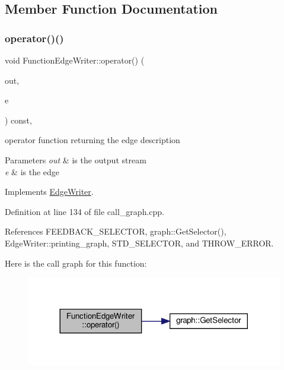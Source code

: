 \subsection{Member Function Documentation}
\mbox{\label{classFunctionEdgeWriter_afadc175ca3b7ff6076556dc850cacfa2}} 
\subsubsection{\texorpdfstring{operator()()}{operator()()}}
{\footnotesize\ttfamily void Function\+Edge\+Writer\+::operator() (\begin{DoxyParamCaption}\item[{std\+::ostream \&}]{out,  }\item[{const \hyperlink{graph_8hpp_a9eb9afea34e09f484b21f2efd263dd48}{Edge\+Descriptor} \&}]{e }\end{DoxyParamCaption}) const\hspace{0.3cm}{\ttfamily [override]}, {\ttfamily [virtual]}}



operator function returning the edge description 


\begin{DoxyParams}{Parameters}
{\em out} & is the output stream \\
\hline
{\em e} & is the edge \\
\hline
\end{DoxyParams}


Implements \hyperlink{classEdgeWriter_a04dc5b68a11dcf253e21d29dfd1e06c3}{Edge\+Writer}.



Definition at line 134 of file call\+\_\+graph.\+cpp.



References F\+E\+E\+D\+B\+A\+C\+K\+\_\+\+S\+E\+L\+E\+C\+T\+OR, graph\+::\+Get\+Selector(), Edge\+Writer\+::printing\+\_\+graph, S\+T\+D\+\_\+\+S\+E\+L\+E\+C\+T\+OR, and T\+H\+R\+O\+W\+\_\+\+E\+R\+R\+OR.

Here is the call graph for this function\+:
\nopagebreak
\begin{figure}[H]
\begin{center}
\leavevmode
\includegraphics[width=317pt]{dd/dea/classFunctionEdgeWriter_afadc175ca3b7ff6076556dc850cacfa2_cgraph}
\end{center}
\end{figure}


